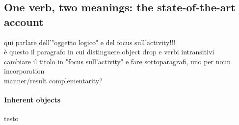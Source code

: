 \subsection{One verb, two meanings: the state-of-the-art account} 

qui parlare dell'"oggetto logico" e del focus sull'activity!!!\\
è questo il paragrafo in cui distinguere object drop e verbi intransitivi\\
cambiare il titolo in "focus sull'activity" e fare sottoparagrafi, uno per noun incorporation\\
manner/result complementarity?

\paragraph{Inherent objects}
testo



